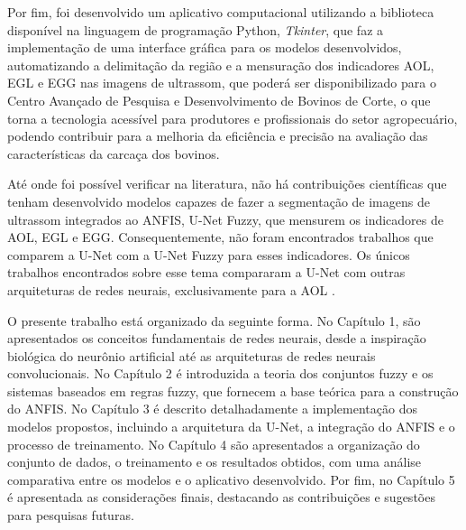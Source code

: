 Por fim, foi desenvolvido um aplicativo computacional utilizando a biblioteca disponível na linguagem de programação Python,  \textit{Tkinter}, que faz a implementação de uma interface gráfica para os modelos desenvolvidos, automatizando a delimitação da região e a mensuração dos indicadores AOL, EGL e EGG nas imagens de ultrassom, que poderá ser disponibilizado para o Centro Avançado de Pesquisa e Desenvolvimento de Bovinos de Corte, o que torna a tecnologia acessível para produtores e profissionais do setor agropecuário, podendo contribuir para a melhoria da eficiência e precisão na avaliação das características da carcaça dos bovinos. 



Até onde foi possível verificar na literatura, não há contribuições científicas que tenham desenvolvido modelos capazes de fazer a segmentação de imagens  de ultrassom integrados ao ANFIS, U-Net Fuzzy, que mensurem os indicadores de AOL, EGL e EGG. Consequentemente, não foram encontrados trabalhos que comparem a U-Net com a U-Net Fuzzy para esses indicadores. Os únicos trabalhos encontrados sobre esse tema compararam a U-Net com outras arquiteturas de redes neurais, exclusivamente para a AOL \cite{JadersonMelo2022UNetpp}.

O presente trabalho está organizado da seguinte forma. No Capítulo 1, são apresentados os conceitos fundamentais de redes neurais, desde a inspiração biológica do neurônio artificial até as arquiteturas de redes neurais convolucionais. No Capítulo 2 é introduzida a teoria dos conjuntos fuzzy e os sistemas baseados em regras fuzzy, que fornecem a base teórica para a construção do ANFIS. No Capítulo 3 é descrito detalhadamente a implementação dos modelos propostos, incluindo a arquitetura da U-Net, a integração do ANFIS e o processo de treinamento. No Capítulo 4 são apresentados a organização do conjunto de dados, o treinamento e os resultados obtidos, com uma análise comparativa entre os modelos e o aplicativo desenvolvido. Por fim, no Capítulo 5 é apresentada as considerações finais, destacando as contribuições e sugestões para pesquisas futuras. 
